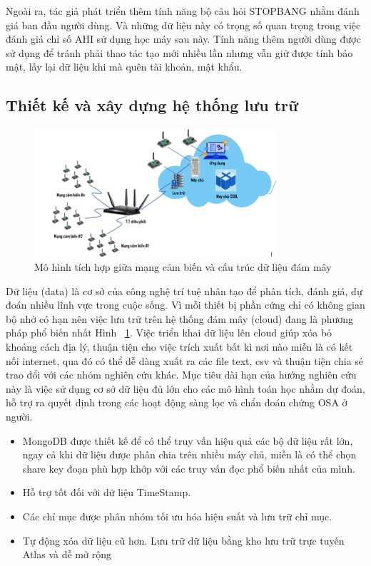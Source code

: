 Ngoài ra, tác giả phát triển thêm tính năng bộ câu hỏi STOPBANG nhằm đánh giá ban đầu người dùng. Và những dữ liệu này có trọng số quan trọng trong việc đánh giá chỉ số AHI sử dụng học máy sau này. Tính năng thêm người dùng được sử dụng để tránh phải thao tác tạo mới nhiều lần nhưng vẫn giữ được tính bảo mật, lấy lại dữ liệu khi mà quên tài khoản, mật khẩu.



\subsection{Thiết kế và xây dựng hệ thống lưu trữ   }
\begin{figure}[b!]
		\centering
 		\includegraphics[width=0.8\textwidth]{images/cloud.png}
		\caption{Mô hình tích hợp giữa mạng cảm biến và cấu trúc dữ liệu đám mây}
		\label{cloud}
\end{figure}


Dữ liệu (data) là cơ sở của công nghệ trí tuệ nhân tạo để phân tích, đánh giá, dự đoán nhiều lĩnh vực trong cuộc sống. Vì mỗi thiết bị phần cứng chỉ có không gian bộ nhớ có hạn nên việc lưu trữ trên hệ thống đám mây (cloud) đang là phương pháp phổ biến nhất Hình ~\ref{cloud}. Việc triển khai dữ liệu lên cloud giúp xóa bỏ khoảng cách địa lý, thuận tiện cho việc trích xuất bất kì nơi nào miễn là có kết nối internet, qua đó có thể dễ dàng xuất ra các file text, csv và thuận tiện chia sẻ trao đổi với các nhóm nghiên cứu khác. Mục tiêu dài hạn của hướng nghiên cứu này là việc sử dụng cơ sở dữ liệu đủ lớn cho các mô hình toán học nhằm dự đoán, hỗ trợ ra quyết định trong các hoạt động sàng lọc và chẩn đoán chứng \gls{OSA} ở người. 


\begin{itemize}
    \item MongoDB được thiết kế để có thể truy vấn hiệu quả các bộ dữ liệu rất lớn, ngay cả khi dữ liệu được phân chia trên nhiều máy chủ, miễn là có thể chọn share key đoạn phù hợp khớp với các truy vấn đọc phổ biến nhất của mình.
    
    \item Hỗ trợ tốt đối với dữ liệu TimeStamp.
    
    \item Các chỉ mục được phân nhóm tối ưu hóa hiệu suất và lưu trữ chỉ mục.
    
    \item Tự động xóa dữ liệu cũ hơn. Lưu trữ dữ liệu bằng kho lưu trữ trực tuyến Atlas và dễ mở rộng
\end{itemize}


